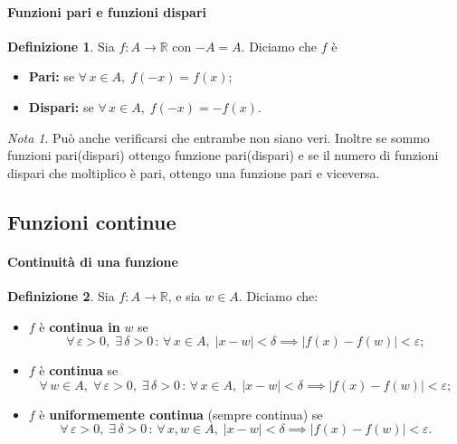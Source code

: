 \documentclass{article}
\theoremstyle{plain}
\theoremstyle{definition}
\newtheorem{defn}{Definizione}[section]
\theoremstyle{remark}
\newtheorem{note}{Nota}
\begin{document}
\paragraph{Funzioni pari e funzioni dispari}
\begin{bxthm}
\begin{defn}
    Sia $f:A\to\mathbb{R}$ con $-A=A$. Diciamo che $f$ è 
    \begin{itemize}
        \item \textbf{Pari: } se $\forall\, x\in A,\;f(-x)=f(x);$
        \item \textbf{Dispari: } se $\forall\, x\in A,\;f(-x)=-f(x).$
    \end{itemize}
\end{defn}
\end{bxthm}

\vspace{10pt}

\begin{note}
    Può anche verificarsi che entrambe non siano veri. 
    Inoltre se sommo funzioni pari(dispari) ottengo funzione pari(dispari) e se il numero di funzioni dispari che moltiplico è pari, ottengo una funzione pari e viceversa.    
\end{note}

\vspace{10pt}

\subsection{Funzioni continue}

\vspace{10pt}

\paragraph{Continuità di una funzione}
\begin{bxthm}
\begin{defn}
    Sia $f:A\to\mathbb{R}$, e sia $w\in A$. 
    Diciamo che:
    \begin{itemize}
        \item $f$ è \textbf{continua in} $w$ se 
        \[\forall\,\varepsilon>0,\;\exists\,\delta>0\,:\,\forall\, x\in A,\; |x-w|<\delta\implies|f(x)-f(w)|<\varepsilon;\]
        \item $f$ è \textbf{continua} se 
        \[\forall\, w\in A,\;\forall\,\varepsilon>0,\;\exists\,\delta>0\,:\,\forall\, x\in A,\; |x-w|<\delta\implies|f(x)-f(w)|<\varepsilon;\]
        \item $f$ è \textbf{uniformemente continua} (sempre continua) se
        \[\forall\,\varepsilon>0,\;\exists\,\delta>0\,:\,\forall\, x,w\in A,\; |x-w|<\delta\implies |f(x)-f(w)|<\varepsilon.\]
    \end{itemize}
\end{defn}
\end{bxthm}
\end{document}
